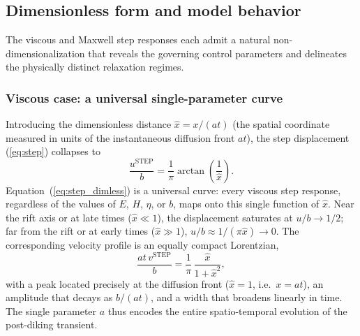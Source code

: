 \documentclass[extra]{gji}
\begin{document}
\subsection{Dimensionless form and model behavior}
\label{sec:dimless}

The viscous and Maxwell step responses each admit a natural non-dimensionalization
that reveals the governing control parameters and delineates the physically
distinct relaxation regimes.

\subsubsection{Viscous case: a universal single-parameter curve}

Introducing the dimensionless distance $\hat{x} = x/(at)$ (the spatial
coordinate measured in units of the instantaneous diffusion front $at$),
the step displacement (\ref{eq:step}) collapses to
\begin{equation}
\frac{u^{\text{STEP}}}{b}
= \frac{1}{\pi}\arctan\!\left(\frac{1}{\hat{x}}\right).
\label{eq:step_dimless}
\end{equation}
Equation~(\ref{eq:step_dimless}) is a universal curve: every viscous step
response, regardless of the values of $E$, $H$, $\eta$, or $b$, maps
onto this single function of $\hat{x}$.  Near the rift axis or at late times
($\hat{x}\ll 1$), the displacement saturates at $u/b\to 1/2$; far from
the rift or at early times ($\hat{x}\gg 1$), $u/b\approx
1/(\pi\hat{x})\to 0$.  The corresponding velocity profile is an equally
compact Lorentzian,
\begin{equation}
\frac{at\,v^{\text{STEP}}}{b}
= \frac{1}{\pi}\,\frac{\hat{x}}{1+\hat{x}^2},
\label{eq:stepv_dimless}
\end{equation}
with a peak located precisely at the diffusion front ($\hat{x}=1$,
i.e.\ $x = at$), an amplitude that decays as $b/(at)$, and a width
that broadens linearly in time.  The single parameter $a$ thus encodes the
entire spatio-temporal evolution of the post-diking transient.
\end{document}
